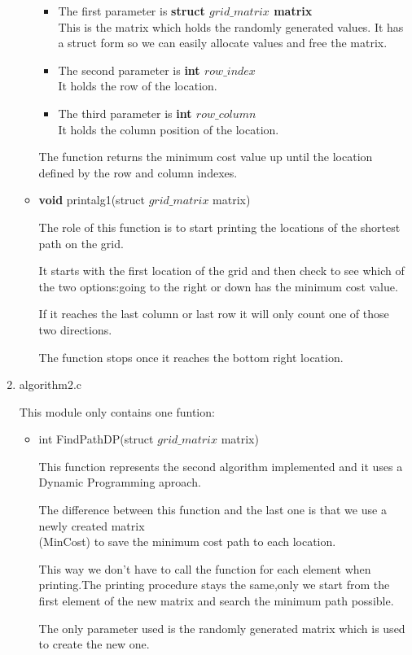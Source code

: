 \documentclass{article}
\begin{document}
\begin{enumerate}
\begin{itemize}
       \begin{itemize}
           \item The first parameter is \textbf{struct $grid\_matrix$ matrix}
           \\This is the matrix which holds the randomly generated values.
           It has a struct form so we can easily allocate values and free the matrix.
           \item The second parameter is \textbf {int $row\_index$}
           \\It holds the row of the location.
           \item The third parameter is \textbf {int $row\_column$}
           \\It holds the column position of the location.
       \end{itemize}
        \par The function returns the minimum cost value up until the location defined by the row and column indexes.
    \newpage
    \item \textbf{void} printalg1(struct $grid\_matrix$ matrix)
    \par The role of this function is to start printing the locations of the
    shortest path on the grid.
    \par It starts with the first location of the grid and then check to see which of the two options:going to the right or down has the minimum cost value.
    \par If it reaches the last column or last row it will only count one of those two directions.
    \par The function stops once it reaches the bottom right location. 
   \end{itemize} 
  \item algorithm2.c
  \par This module only contains one funtion:
  \begin{itemize}
      \item int FindPathDP(struct $grid\_matrix$ matrix)
      \par This function represents the second algorithm implemented and it uses a Dynamic Programming aproach.
     \par The difference between this function and the last one is that
     we use a newly created matrix\\(MinCost) to save the minimum cost path to each location.
     \par This way we don't have to call the function for each element
     when printing.The printing procedure stays the same,only we start from the first element of the new matrix and search the minimum path possible.
     \\
     \par The only parameter used is the randomly generated matrix which is used to create the new one.
    

\end{itemize}
\end{enumerate}
\end{document}
